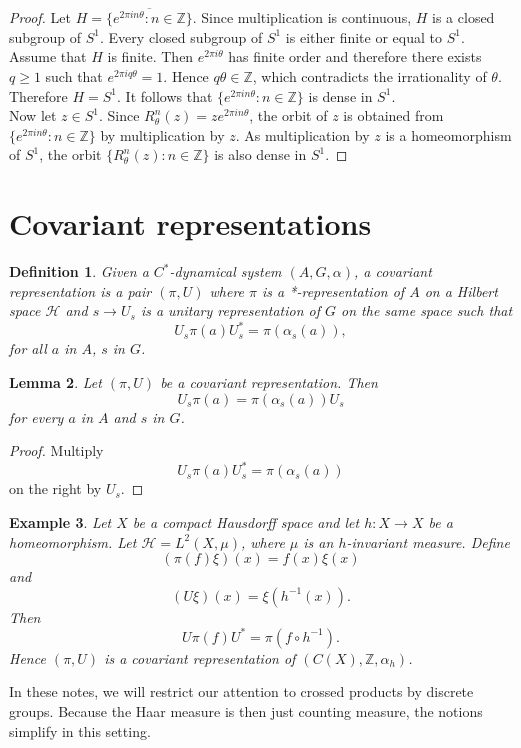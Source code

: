 \documentclass{book}
\newtheorem{definition}{Definition}[section]
\newtheorem{lemma}[definition]{Lemma}
\newtheorem{example}[definition]{Example}
\begin{document}
\begin{proof}
  Let
  \(H=\overline{\{e^{2\pi i n\theta}:n\in\mathbb Z\}}\).
  Since multiplication is continuous, \(H\) is a closed subgroup of \(S^1\).
  Every closed subgroup of \(S^1\) is either finite or equal to \(S^1\).
  Assume that \(H\) is finite.
  Then \(e^{2\pi i\theta}\) has finite order and therefore there exists
  \(q\ge1\) such that
  \(e^{2\pi iq\theta}=1\).
  Hence \(q\theta\in\mathbb{Z}\),
  which contradicts the irrationality of \(\theta\).
  Therefore \(H=S^1\).
  It follows that
  \(\{e^{2\pi i n\theta}:n\in\mathbb Z\}\)
  is dense in \(S^1\).\\
  Now let \(z\in S^1\).
  Since
  \(R_\theta^n(z)=ze^{2\pi i n\theta}\),
  the orbit of \(z\) is obtained from
  \(\{e^{2\pi i n\theta}:n\in\mathbb Z\}\)
  by multiplication by \(z\).
  As multiplication by \(z\) is a homeomorphism of \(S^1\),
  the orbit
  \(\{R_\theta^n(z):n\in\mathbb Z\}\)
  is also dense in \(S^1\).
\end{proof}

\section{Covariant representations}





\begin{definition}
  Given a \(C^*\)-dynamical system \((A, G, \alpha)\), a \textnormal{covariant 
  representation} is a pair \((\pi, U)\) where \(\pi\) is a *-representation of \(A\) on a Hilbert 
  space \(\mathcal{H}\) and \(s \rightarrow U_s\) is a unitary representation of \(G\) on the same space such that 
  \[
    U_s\pi(a)U^*_s = \pi(\alpha_s(a)), 
  \]
  for all \(a\) in \(A\), \(s\) in \(G\).
\end{definition}
\begin{lemma}
  Let \((\pi,U)\) be a covariant representation.
  Then
  \[
  U_s\pi(a)
  =
  \pi(\alpha_s(a))U_s
  \]
  for every \(a\) in \(A\) and \(s\) in \(G\).
\end{lemma}
\begin{proof}
  Multiply
  \[
  U_s\pi(a)U_s^*
  =
  \pi(\alpha_s(a))
  \]
  on the right by \(U_s\).
\end{proof}
\begin{example}
  Let \(X\) be a compact Hausdorff space and let
  \(h:X\to X\)
  be a homeomorphism.
  Let \(\mathcal{H}=L^2(X,\mu)\), where \(\mu\) is an \(h\)-invariant measure.
  Define
  \[(\pi(f)\xi)(x)
  =
  f(x)\xi(x)\]
  and
  \[(U\xi)(x)
  =
  \xi(h^{-1}(x)).\]
  Then
  \[U\pi(f)U^*
  =
  \pi(f\circ h^{-1}).\]
  Hence \((\pi,U)\) is a covariant representation of
  \((C(X),\mathbb Z,\alpha_h)\).
\end{example}
In these notes, we will restrict our attention to crossed products by discrete 
groups. Because the Haar measure is then just counting measure, the notions simplify in this setting. 
\end{document}
